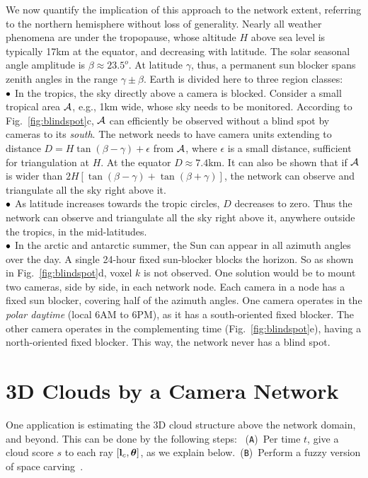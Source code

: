 \documentclass[runningheads]{llncs}
\begin{document}
We now quantify the implication of this approach to the network extent, referring to the northern hemisphere without loss of generality.
Nearly all weather phenomena are under the tropopause, whose altitude $H$ above sea level is typically 17km at the equator, and decreasing with latitude. The solar seasonal angle amplitude is $\beta\approx23.5^o$. At latitude $\gamma$, thus, a permanent sun blocker spans zenith angles in the range $\gamma\pm\beta$. Earth is divided here to three region classes:\\
  ${\bf \bullet}$ In the tropics, the sky directly above a camera is blocked. Consider
  a small tropical area ${\cal A}$, e.g., 1km wide, whose sky needs to be monitored. According to Fig.~\ref{fig:blindspot}c, ${\cal A}$ can efficiently be observed without
  a blind spot by cameras to its {\em south}. The network needs to have camera units extending to distance  $D=H\tan(\beta-\gamma)+\epsilon$ from ${\cal A}$, where $\epsilon$ is a small distance, sufficient for triangulation at $H$. At the equator $D\approx7.4$km.
  It can also be shown that if ${\cal A}$ is wider than $2H[\tan(\beta-\gamma)+\tan(\beta+\gamma)]$, the network can observe and triangulate all the sky right above it.\\
${\bf \bullet}$  As latitude increases towards the tropic circles, $D$ decreases to zero. Thus the network can observe and triangulate all the sky right above it, anywhere outside the tropics, in the mid-latitudes.\\
  ${\bf \bullet}$ In the arctic and antarctic summer, the Sun can appear in all azimuth angles over the day. A single 24-hour fixed sun-blocker blocks the horizon. So as shown in Fig.~\ref{fig:blindspot}d, voxel $k$ is not observed. One solution would be to mount two cameras, side by side, in each network node. Each camera in a node has a fixed sun blocker, covering half of the azimuth angles. One camera operates in the {\em polar daytime} (local 6AM to 6PM), as it has a south-oriented fixed blocker. The other camera operates in the complementing time (Fig.~\ref{fig:blindspot}e), having a north-oriented fixed blocker. This way, the network never has a blind spot.


\section{3D Clouds by a Camera Network}
\label{sec:3Dc}

One application is estimating the 3D cloud structure above the network domain, and beyond. This can be done by the following steps:~ %
({\tt A})~Per time $t$, give a {\rm cloud score} $s$  to each ray $[{\bf l}_c,{\bm \theta}]$, as we explain below.~({\tt B})~Perform a fuzzy version of space carving~\cite{Kutulakos2000,Ihrke2004}.
\end{document}
